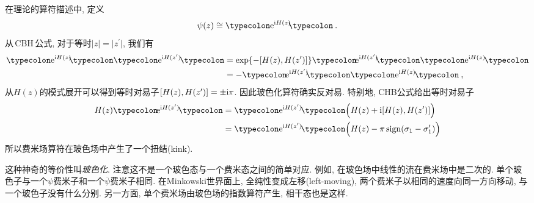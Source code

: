 在理论的算符描述中, 定义
\begin{equation}
    \psi(z)\cong \typecolon \me^{\mi H(z)}\!\!\typecolon \:.\label{10.3.14}
\end{equation}
从\,CBH\,公式, 对于等时$ \lvert z\rvert =\lvert z^{\prime}\rvert$, 我们有
\begin{align}
     \typecolon \me^{\mi H(z)}\!\!\typecolon  \typecolon \me^{\mi H(z^{\prime})}\!\typecolon 
     &=\exp\{-[H(z),H(z^{\prime})]\}\typecolon\! \me^{\mi H(z^{\prime})}\!\!\typecolon 
      \typecolon \me^{\mi H(z)}\!\typecolon \nonumber \\
      &=-\typecolon \!\me^{\mi H(z^{\prime})}\!\!\typecolon  \typecolon \me^{\mi H(z)}\!\typecolon \:,\label{10.3.15}
\end{align}
从$H(z)$的模式展开可以得到等时对易子$ [H(z),H(z^{\prime})]=\pm\mathrm{i}\pi$. 因此玻色化算符确实反对易. 特别地, CHB公式给出等时对易子
\begin{align}
    H(z)\typecolon\!\me^{\mi H(z^{\prime})}\!\typecolon &=\typecolon\me^{\mi H(z^{\prime})}\!\typecolon 
    \Bigl(H(z)+\mi[H(z),H(z^{\prime})]\Bigr) \nonumber \\
    &=\typecolon\me^{\mi H(z^{\prime})}\!\typecolon \Bigl(H(z)- \pi\,\mathrm{sign}(\sigma_{1}-\sigma_{1}^{\prime})\Bigr)
\end{align}
所以费米场算符在玻色场中产生了一个扭结(kink).

这种神奇的等价性叫{\emph{玻色化}}. 注意这不是一个玻色态与一个费米态之间的简单对应. 例如, 在玻色场中线性的流在费米场中是二次的. 单个玻色子与一个$ \psi $费米子和一个$ \overline{\psi} $费米子相同. 在Minkowski世界面上, 全纯性变成左移(left-moving), 两个费米子以相同的速度向同一方向移动, 与一个玻色子没有什么分别. 另一方面, 单个费米场由玻色场的指数算符产生, 相干态也是这样.

